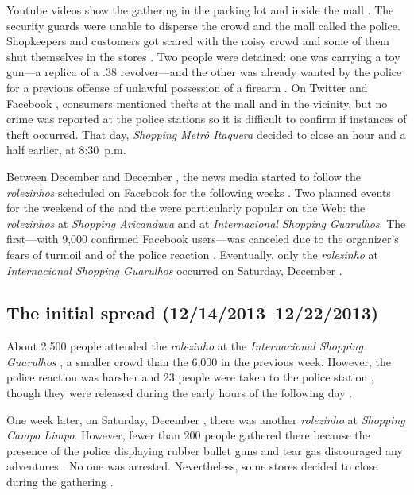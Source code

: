 Youtube videos show the gathering in the parking lot \autocite{youtube_primeiro_rolezinho_outside} and inside the mall \autocite{youtube_primeiro_rolezinho_inside}. The security guards were unable to disperse the crowd and the mall called the police. Shopkeepers and customers got scared with the noisy crowd and some of them shut themselves in the stores \autocite{agora_arrastao_itaquera}. Two people were detained: one was carrying a toy gun---a replica of a .38 revolver---and the other was already wanted by the police for a previous offense of unlawful possession of a firearm \autocite{estado_arrastao_itaquera}. On Twitter \autocite{twitter_arrastao_itaquera} and Facebook \autocite{facebook_nota_metro_itaquera}, consumers mentioned thefts at the mall and in the vicinity, but no crime was reported at the police stations so it is difficult to confirm if instances of theft occurred. That day, \emph{Shopping Metrô Itaquera} decided to close an hour and a half earlier, at 8:30~p.m.

Between December  and December , the news media started to follow the \emph{rolezinhos} scheduled on Facebook for the following weeks \autocite{agora_novas_invasoes,estado_novas_invasoes,veja_novas_invasoes,r7_novas_invasoes,estado_novas_invasoes_2}. Two planned events for the weekend of the  and the  were particularly popular on the Web: the \emph{rolezinhos} at \emph{Shopping Aricanduva} and at \emph{Internacional Shopping Guarulhos}. The first---with 9,000 confirmed Facebook users---was canceled due to the organizer's fears of turmoil and of the police reaction \autocite{cancelamento_shopping_aricanduva}. Eventually, only the \emph{rolezinho} at \emph{Internacional Shopping Guarulhos} occurred on Saturday, December .

\subsection*{The initial spread (12/14/2013--12/22/2013)}

About 2,500 people attended the \emph{rolezinho} at the \emph{Internacional Shopping Guarulhos} \autocite{g1_guarulhos}, a smaller crowd than the 6,000 in the previous week. However, the police reaction was harsher and 23 people were taken to the police station \autocite{estado_guarulhos,folha_guarulhos}, though they were released during the early hours of the following day \autocite{folha_libertacao_guarulhos}.

One week later, on Saturday, December , there was another \emph{rolezinho} at \emph{Shopping Campo Limpo}. However, fewer than 200 people gathered there because the presence of the police displaying rubber bullet guns and tear gas discouraged any adventures \autocite{folha_campo_limpo_1}. No one was arrested. Nevertheless, some stores decided to close during the gathering \autocite{folha_campo_limpo_2}.

